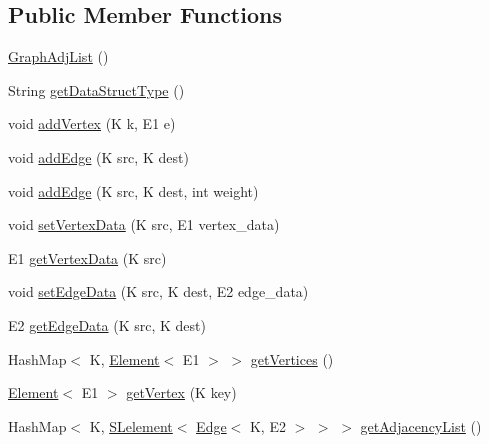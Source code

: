 \subsection*{Public Member Functions}
\begin{DoxyCompactItemize}
\item 
\mbox{\hyperlink{classbridges_1_1base_1_1_graph_adj_list_aba7e066f43d361418ae6bdf53a23b1de}{Graph\+Adj\+List}} ()
\item 
String \mbox{\hyperlink{classbridges_1_1base_1_1_graph_adj_list_a40c4a2faf20c9847e8ba0d8024236a4b}{get\+Data\+Struct\+Type}} ()
\item 
void \mbox{\hyperlink{classbridges_1_1base_1_1_graph_adj_list_aca59a3c40af4ae82716ebbfa1751f267}{add\+Vertex}} (K k, E1 e)
\item 
void \mbox{\hyperlink{classbridges_1_1base_1_1_graph_adj_list_a43041976184920e1db1dbe3ad696c6cd}{add\+Edge}} (K src, K dest)
\item 
void \mbox{\hyperlink{classbridges_1_1base_1_1_graph_adj_list_ab871e88553047930648c2c1ac1a9797e}{add\+Edge}} (K src, K dest, int weight)
\item 
void \mbox{\hyperlink{classbridges_1_1base_1_1_graph_adj_list_aa80bfbbe9c4dd130632db1e1165d635e}{set\+Vertex\+Data}} (K src, E1 vertex\+\_\+data)
\item 
E1 \mbox{\hyperlink{classbridges_1_1base_1_1_graph_adj_list_a3d5f73795bcd5011c425eaca33383454}{get\+Vertex\+Data}} (K src)
\item 
void \mbox{\hyperlink{classbridges_1_1base_1_1_graph_adj_list_a48041b13b10d5fb677f48a0debfc268e}{set\+Edge\+Data}} (K src, K dest, E2 edge\+\_\+data)
\item 
E2 \mbox{\hyperlink{classbridges_1_1base_1_1_graph_adj_list_a13cdc7ed89fb211f47e2b04da0b65561}{get\+Edge\+Data}} (K src, K dest)
\item 
Hash\+Map$<$ K, \mbox{\hyperlink{classbridges_1_1base_1_1_element}{Element}}$<$ E1 $>$ $>$ \mbox{\hyperlink{classbridges_1_1base_1_1_graph_adj_list_acd53b2393db0936ad5812997f67ee1ee}{get\+Vertices}} ()
\item 
\mbox{\hyperlink{classbridges_1_1base_1_1_element}{Element}}$<$ E1 $>$ \mbox{\hyperlink{classbridges_1_1base_1_1_graph_adj_list_aa19cd300a85b05352bdf58720310a112}{get\+Vertex}} (K key)
\item 
Hash\+Map$<$ K, \mbox{\hyperlink{classbridges_1_1base_1_1_s_lelement}{S\+Lelement}}$<$ \mbox{\hyperlink{classbridges_1_1base_1_1_edge}{Edge}}$<$ K, E2 $>$ $>$ $>$ \mbox{\hyperlink{classbridges_1_1base_1_1_graph_adj_list_a77771e356aa8bf44525be9ae01603989}{get\+Adjacency\+List}} ()

\end{DoxyCompactItemize}
